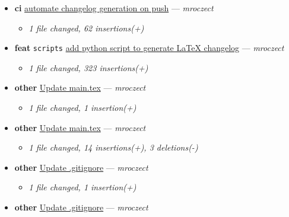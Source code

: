 \begin{itemize}[leftmargin=1.5em]
\begin{itemize}[leftmargin=1.5em]
    \item \small\textit{1 file changed, 4 insertions(+)}
  \end{itemize}
  \item \textbf{ci} \href{https://github.com/mroczect/mroczect.github.io/commit/c0014691f5b672976777594ecc0e115fb90caa60}{automate changelog generation on push} --- \textit{mroczect}
  \begin{itemize}[leftmargin=1.5em]
    \item \small\textit{1 file changed, 62 insertions(+)}
  \end{itemize}
  \item \textbf{feat} \texttt{scripts} \href{https://github.com/mroczect/mroczect.github.io/commit/f8cf1b4eb6f563a752c8ff7a8d1d8df287f07439}{add python script to generate LaTeX changelog} --- \textit{mroczect}
  \begin{itemize}[leftmargin=1.5em]
    \item \small\textit{1 file changed, 323 insertions(+)}
  \end{itemize}
  \item \textbf{other} \href{https://github.com/mroczect/mroczect.github.io/commit/b2d1f9c6b2ddab78b2ff832be591a62ee0975de4}{Update main.tex} --- \textit{mroczect}
  \begin{itemize}[leftmargin=1.5em]
    \item \small\textit{1 file changed, 1 insertion(+)}
  \end{itemize}
  \item \textbf{other} \href{https://github.com/mroczect/mroczect.github.io/commit/e424e3c8a307c6bb3abef1412fdffe1b94e88ef7}{Update main.tex} --- \textit{mroczect}
  \begin{itemize}[leftmargin=1.5em]
    \item \small\textit{1 file changed, 14 insertions(+), 3 deletions(-)}
  \end{itemize}
  \item \textbf{other} \href{https://github.com/mroczect/mroczect.github.io/commit/ccfc055a4bcb7ceb8bc65fd56d746ea9d8e03225}{Update .gitignore} --- \textit{mroczect}
  \begin{itemize}[leftmargin=1.5em]
    \item \small\textit{1 file changed, 1 insertion(+)}
  \end{itemize}
  \item \textbf{other} \href{https://github.com/mroczect/mroczect.github.io/commit/3a55e0ae4ddebc4c9c035daca2d4f637788874b0}{Update .gitignore} --- \textit{mroczect}

\end{itemize}

